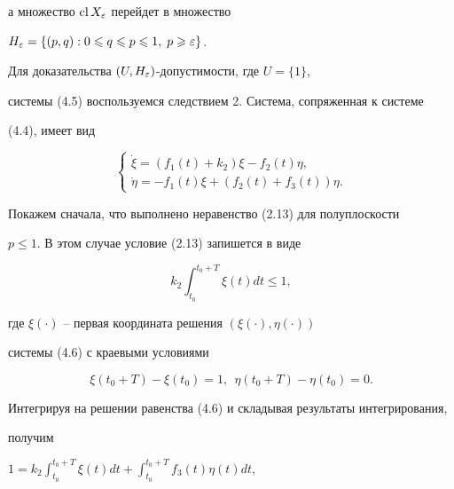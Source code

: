 %


а множество $\operatorname{cl} X_{\varepsilon}$ перейдет в множество


$H_{\varepsilon}=\{(p,q) : 0\leqslant q \leqslant p \leqslant 1,\;p\geqslant \varepsilon \}$.


Для доказательства $(U,H_{\varepsilon})$-допустимости, где $U=\{1\}$,


системы (4.5) воспользуемся следствием 2. Система, сопряженная к системе


(4.4), имеет вид


%


\begin{equation}


\begin{cases}


\Dot \xi=  (f_1(t) + k_2)\xi - f_2(t)\eta, \\ 


\Dot \eta= -f_1(t)\xi + (f_2(t) + f_3(t))\eta.


\end{cases}


\end{equation}


%


Покажем сначала, что выполнено неравенство (2.13) для полуплоскости


$p\le 1.$ В этом случае условие (2.13) запишется в виде


%


\begin{equation}


k_2\int_{t_0}^{t_0+T}\xi(t) dt \le 1,


\end{equation}


%


где $\xi(\cdot)$ -- первая координата решения $(\xi(\cdot),\eta(\cdot))$


системы (4.6) с краевыми условиями


%


\begin{equation}


\xi(t_0+T) - \xi(t_0) = 1,\ \ \eta(t_0+T) - \eta(t_0) = 0.


\end{equation}


%


Интегрируя на решении равенства (4.6) и складывая результаты интегрирования,


получим


$1=k_2\int_{t_0}^{t_0+T}\xi(t) dt + \int_{t_0}^{t_0+T}f_3(t)\eta (t)dt$,


